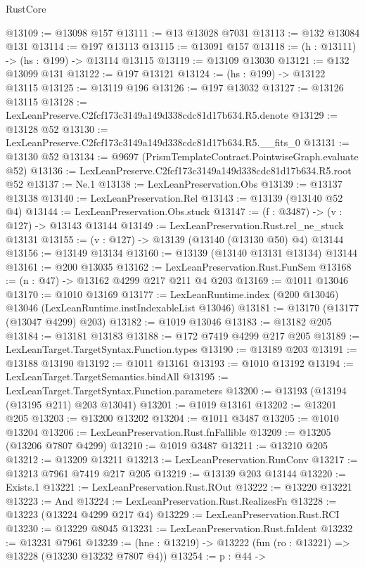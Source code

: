 \begin{lexlean}{RustCore}
\begin{coremodule}
@13109 := @13098 @157
@13111 := @13 @13028 @7031
@13113 := @132 @13084 @131
@13114 := @197 @13113
@13115 := @13091 @157
@13118 := (h : @13111) -> (hs : @199) -> @13114 @13115
@13119 := @13109 @13030
@13121 := @132 @13099 @131
@13122 := @197 @13121
@13124 := (hs : @199) -> @13122 @13115
@13125 := @13119 @196
@13126 := @197 @13032
@13127 := @13126 @13115
@13128 := LexLeanPreserve.C2fcf173c3149a149d338cdc81d17b634.R5.denote
@13129 := @13128 @52
@13130 := LexLeanPreserve.C2fcf173c3149a149d338cdc81d17b634.R5.__fits_0
@13131 := @13130 @52
@13134 := @9697 (PrismTemplateContract.PointwiseGraph.evaluate @52)
@13136 := LexLeanPreserve.C2fcf173c3149a149d338cdc81d17b634.R5.root @52
@13137 := Ne.{1}
@13138 := LexLeanPreservation.Obs
@13139 := @13137 @13138
@13140 := LexLeanPreservation.Rel
@13143 := @13139 (@13140 @52 @4)
@13144 := LexLeanPreservation.Obs.stuck
@13147 := (f : @3487) -> (v : @127) -> @13143 @13144
@13149 := LexLeanPreservation.Rust.rel_ne_stuck @13131
@13155 := (v : @127) -> @13139 (@13140 (@13130 @50) @4) @13144
@13156 := @13149 @13134
@13160 := @13139 (@13140 @13131 @13134) @13144
@13161 := @200 @13035
@13162 := LexLeanPreservation.Rust.FunSem
@13168 := (n : @47) -> @13162 @4299 @217 @211 @4 @203
@13169 := @1011 @13046
@13170 := @1010 @13169
@13177 := LexLeanRuntime.index (@200 @13046) @13046 (LexLeanRuntime.instIndexableList @13046)
@13181 := @13170 (@13177 (@13047 @4299) @203)
@13182 := @1019 @13046
@13183 := @13182 @205
@13184 := @13181 @13183
@13188 := @172 @7419 @4299 @217 @205
@13189 := LexLeanTarget.TargetSyntax.Function.types
@13190 := @13189 @203
@13191 := @13188 @13190
@13192 := @1011 @13161
@13193 := @1010 @13192
@13194 := LexLeanTarget.TargetSemantics.bindAll
@13195 := LexLeanTarget.TargetSyntax.Function.parameters
@13200 := @13193 (@13194 (@13195 @211) @203 @13041)
@13201 := @1019 @13161
@13202 := @13201 @205
@13203 := @13200 @13202
@13204 := @1011 @3487
@13205 := @1010 @13204
@13206 := LexLeanPreservation.Rust.fnFallible
@13209 := @13205 (@13206 @7807 @4299)
@13210 := @1019 @3487
@13211 := @13210 @205
@13212 := @13209 @13211
@13213 := LexLeanPreservation.RunConv
@13217 := @13213 @7961 @7419 @217 @205
@13219 := @13139 @203 @13144
@13220 := Exists.{1}
@13221 := LexLeanPreservation.Rust.ROut
@13222 := @13220 @13221
@13223 := And
@13224 := LexLeanPreservation.Rust.RealizesFn
@13228 := @13223 (@13224 @4299 @217 @4)
@13229 := LexLeanPreservation.Rust.RCI
@13230 := @13229 @8045
@13231 := LexLeanPreservation.Rust.fnIdent
@13232 := @13231 @7961
@13239 := (hne : @13219) -> @13222 (fun (ro : @13221) => @13228 (@13230 @13232 @7807 @4))
@13254 := {p : @44} ->

\end{coremodule}
\end{lexlean}

